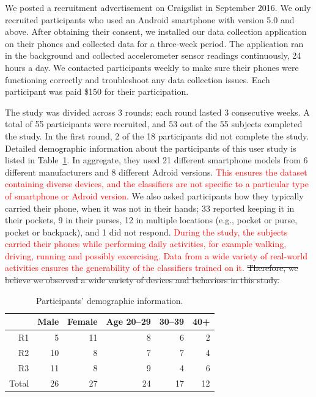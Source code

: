 We posted a recruitment advertisement on Craigslist in September 2016. 
We only recruited participants who used an Android smartphone with version 5.0 and above. 
After obtaining their consent, we installed our data collection application on their phones and collected data for a three-week period.
The application ran in the background and collected accelerometer sensor readings continuously, 24 hours a day.
We contacted participants weekly to make sure their phones were functioning correctly and troubleshoot any data collection issues.
Each participant was paid \$150 for their participation.

The study was divided across 3 rounds; each round lasted 3 consecutive weeks. 
A total of 55 participants were recruited, and
53 out of the 55 subjects completed the study. 
In the first round, 2 of the 18 participants did not complete the study.
Detailed demographic information about the participants of this user study is listed in Table~\ref{tbl:demographics}.
In aggregate, they used 21 different smartphone models from 6 different manufacturers and 8 different Adroid versions. \textcolor{red}{This ensures the dataset containing diverse devices, and the classifiers are not specific to a particular type of smartphone or Adroid version.}
We also asked participants how they typically carried their phone, when it was not in their hands; 33 reported keeping it in their pockets, 9 in their purses, 12 in multiple locations (e.g., pocket or purse, pocket or backpack), and 1 did not respond.
\textcolor{red}{During the study, the subjects carried their phones while performing daily activities, for example walking, driving, running and possibly excercising. Data from a wide variety of real-world activities ensures the generability of the classifiers trained on it.} \st{Therefore, we believe we observed a wide variety of devices and behaviors in this study.}

\begin{table}[H]
\centering
\begin{tabular}{rrrrrr}
\hline
      & Male & Female & Age 20--29 & 30--39 & 40+ \\ \hline
R1    & 5    & 11     & 8         & 6     & 2   \\
R2    & 10   & 8      & 7         & 7     & 4   \\
R3    & 11   & 8      & 9         & 4     & 6   \\
Total & 26   & 27     & 24        & 17    & 12  \\ \hline
\end{tabular}
\caption{Participants' demographic information.}
\label{tbl:demographics}
\end{table}




